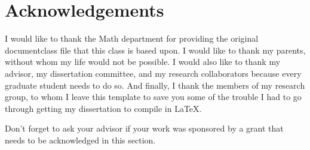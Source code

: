 \chapter*{Acknowledgements}

I would like to thank the Math department for providing the original documentclass file that this class is based upon. I would like to thank my parents, without whom my life would not be possible. I would also like to thank my advisor, my dissertation committee, and my research collaborators because every graduate student needs to do so. And finally, I thank the members of my research group, to whom I leave this template to save you some of the trouble I had to go through getting my dissertation to compile in \LaTeX{}.  

Don't forget to ask your advisor if your work was sponsored by a grant that needs to be acknowledged in this section.  